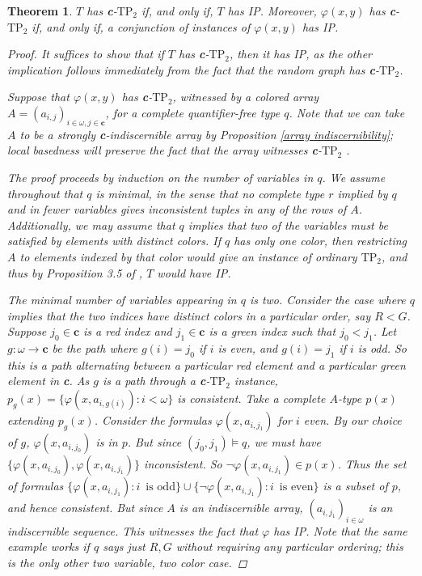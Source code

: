 \documentclass{article}
\newcommand{\TPii}{\text{TP}_2}
\newcommand{\vphi}{\varphi}
\newtheorem{theorem}{Theorem}
\theoremstyle{definition}
\theoremstyle{definition}
\theoremstyle{definition}
\theoremstyle{definition}
\begin{document}
\begin{theorem}\label{IP=cTP2 theorem}
    $T$ has \textbf{c}-$\TPii$ if, and only if, $T$ has IP. Moreover, $\vphi(x,y)$ has \textbf{c}-$\TPii$ if, and only if, a conjunction of instances of $\vphi(x,y)$ has IP.

\begin{proof}
    It suffices to show that if $T$ has \textbf{c}-$\TPii$, then it has IP, as the other implication follows immediately from the fact that the random graph has \textbf{c}-$\TPii$.

    Suppose that $\vphi(x,y)$ has \textbf{c}-$\TPii$, witnessed by a colored array $A=(a_{i,j})_{i\in\omega, j\in \textbf{c}}$, for a complete quantifier-free type $q$. Note that we can take $A$ to be a strongly \textbf{c}-indiscernible array by Proposition \ref{array indiscernibility}; local basedness will preserve the fact that the array witnesses \textbf{c}-$\TPii$ .

    The proof proceeds by induction on the number of variables in $q$. We assume throughout that $q$ is minimal, in the sense that no complete type $r$ implied by $q$ and in fewer variables gives inconsistent tuples in any of the rows of $A$. Additionally, we may assume that $q$ implies that two of the variables must be satisfied by elements with distinct colors. If $q$ has only one color, then restricting $A$ to elements indexed by that color would give an instance of ordinary $\TPii$, and thus by Proposition 3.5 of \cite{chernikov2014theories}, $T$ would have IP.

    The minimal number of variables appearing in $q$ is two. Consider the case where $q$ implies that the two indices have distinct colors in a particular order, say $R<G$. Suppose $j_0\in \textbf{c}$ is a red index and $j_1\in \textbf{c}$ is a green index such that $j_0<j_1$. Let $g\colon \omega\to \textbf{c}$ be the path where $g(i)=j_0$  if $i$ is even, and $g(i)=j_1$ if $i$ is odd. So this is a path alternating between a particular red element and a particular green element in \textbf{c}. As $g$ is a path through a \textbf{c}-$\TPii$ instance, $p_g(x)=\{\vphi(x,a_{i,g(i)})\colon i<\omega\}$ is consistent. Take a complete $A$-type $p(x)$ extending $p_g(x)$. Consider the formulas $\vphi(x, a_{i,j_1})$ for $i$ even. By our choice of $g$, $\vphi(x,a_{i,j_0})$ is in $p$. But since $(j_0,j_1)\models q$, we must have $\{\vphi(x, a_{i,j_0}), \vphi(x, a_{i,j_1})\}$ inconsistent. So $\neg\vphi(x, a_{i,j_1})\in p(x)$. Thus the set of formulas $\{\vphi(x, a_{i,j_1})\colon i\enspace\text{is odd}\}\cup \{\neg\vphi(x, a_{i,j_1})\colon i\enspace\text{is even}\}$ is a subset of $p$, and hence consistent. But since $A$ is an indiscernible array, $(a_{i, j_1})_{i\in\omega}$ is an indiscernible sequence. This witnesses the fact that $\vphi$ has IP. Note that the same example works if $q$ says just $R,G$ without requiring any particular ordering; this is the only other two variable, two color case.


\end{proof}
\end{theorem}
\end{document}
